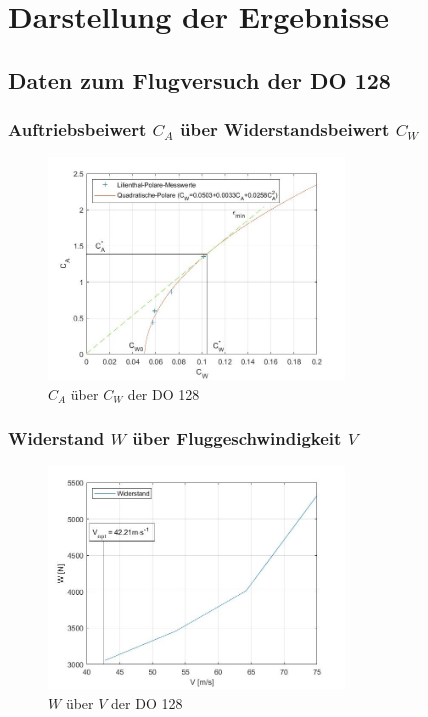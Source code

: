 \chapter{Darstellung der Ergebnisse}
\label{c:Ergebnisse}

\section{Daten zum Flugversuch der DO 128}

\subsection{Auftriebsbeiwert $C_A$ über Widerstandsbeiwert $C_{W}$}

\begin{figure}[H]
	\centering	\includegraphics[width=0.7\textwidth]{./Bilder/CA_CW_DO128_NEU.jpg}
	\caption{$C_{A}$ über $C_{W}$ der DO 128}
	\label{fig:CA_CW_DO128}
\end{figure}

\subsection{Widerstand $W$ über Fluggeschwindigkeit $V$}
\label{ss:W_V}

\begin{figure}[H]
	\centering	\includegraphics[width=0.7\textwidth]{./Bilder/W_V_DO128_NEU.jpg}
	\caption{$W$ über $V$ der DO 128}
	\label{fig:W_V_DO128}
\end{figure}

